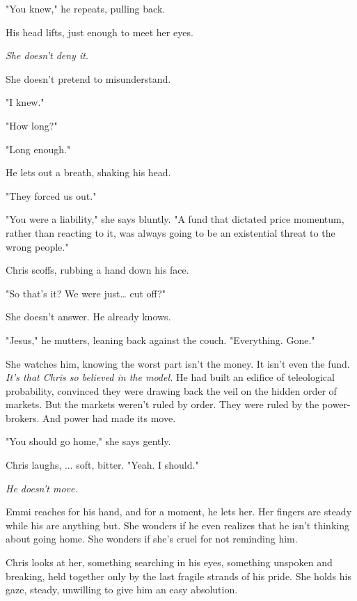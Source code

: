 "You knew," he repeats, pulling back.  

His head lifts, just enough to meet her eyes.  

\smallskip

\textit{She doesn’t deny it.}  

She doesn’t pretend to misunderstand.  

"I knew."

"How long?"  

"Long enough." 

\smallskip

He lets out a breath, shaking his head.  

"They forced us out." 

"You were a liability," she says bluntly. "A fund that dictated price momentum, rather than reacting to it, was always going to be an existential threat to the wrong people."

Chris scoffs, rubbing a hand down his face.  

"So that’s it? We were just… cut off?"

She doesn’t answer. He already knows.  

\smallskip

\noindent
"Jesus," he mutters, leaning back against the couch. "Everything. Gone." 

\bigskip

She watches him, knowing the worst part isn’t the money. It isn’t even the fund.  \textit{It’s that Chris so believed in the model.}  He had built an edifice of teleological probability, convinced they were drawing back the veil on the hidden order of markets. But the markets weren’t ruled by order.  They were ruled by the power-brokers. And power had made its move.  

\bigskip

"You should go home," she says gently.  

Chris laughs, ... soft, bitter. "Yeah. I should."

\textit{He doesn’t move.}  

\smallskip

Emmi reaches for his hand, and for a moment, he lets her. Her fingers are steady while his are anything but. She wonders if he even realizes that he isn’t thinking about going home.  She wonders if she’s cruel for not reminding him. 

\smallskip

Chris looks at her, something searching in his eyes, something unspoken and breaking, held together only by the last fragile strands of his pride. She holds his gaze, steady, unwilling to give him an easy absolution.  

